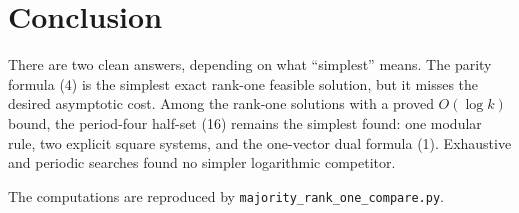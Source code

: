 \documentclass[11pt]{article}
\newcommand{\1}{\mathbf 1}
\begin{document}
\section{Conclusion}

There are two clean answers, depending on what ``simplest'' means.
The parity formula (4) is the simplest exact rank-one feasible solution,
but it misses the desired asymptotic cost.  Among the rank-one solutions
with a proved $O(\log k)$ bound, the period-four half-set (16) remains the
simplest found: one modular rule, two explicit square systems, and the
one-vector dual formula (1).  Exhaustive and periodic searches found no
simpler logarithmic competitor.

The computations are reproduced by
\texttt{majority\_rank\_one\_compare.py}.
\end{document}
